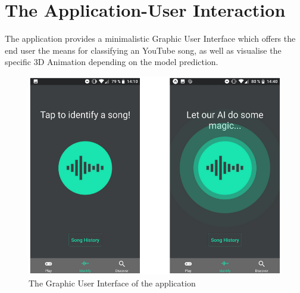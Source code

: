 \section{The Application-User Interaction}
	The application provides a minimalistic Graphic User Interface which offers the end user the means for
	classifying an YouTube song, as well as visualise the specific 3D Animation depending on the model prediction.


			\begin{figure}[H]
				\centering
				\includegraphics{images/spektrum.png}
				\caption{The Graphic User Interface of the application}
			\label{gui}
			\end{figure}

